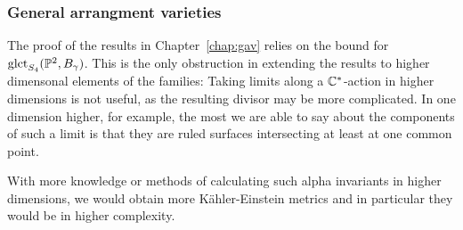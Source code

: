 \subsubsection*{General arrangment varieties}
The proof of the results in Chapter~\ref{chap:gav} relies on the bound for \( \operatorname{glct}_{S_4}(\mathbb{P}^2, B_\gamma)\). This is the only obstruction in extending the results to higher dimensonal elements of the families: Taking limits along a \(\mathbb{C}^*\)-action in higher dimensions is not useful, as the resulting divisor may be more complicated. In one dimension higher, for example, the most we are able to say about the components of such a limit is that they are ruled surfaces intersecting at least at one common point.

With more knowledge or methods of calculating such alpha invariants in higher dimensions, we would obtain more K\"ahler-Einstein metrics and in particular they would be in higher complexity.